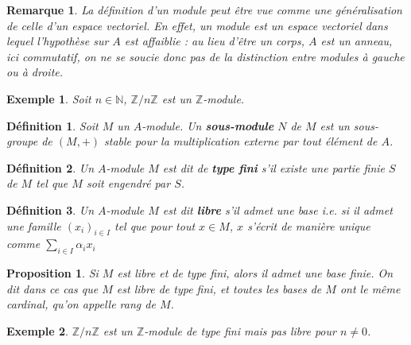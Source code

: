 \documentclass[a4paper,12pt]{report}  %
\theoremstyle{definitionstyle}
\newtheorem{definition}{Définition}[chapter] %
\theoremstyle{examplestyle}
\newtheorem{example}{Exemple}[chapter] %
\theoremstyle{remarkstyle}
\newtheorem{remark}{Remarque}[chapter] %
\theoremstyle{propositionstyle}
\newtheorem{proposition}{Proposition}[chapter]  %
\theoremstyle{theoremstyle}
\begin{document}
	\begin{remark}
		La définition d'un module peut être vue comme une généralisation de celle d'un espace vectoriel. En effet, un module est un espace vectoriel dans lequel l'hypothèse sur $A$ est affaiblie : au lieu d'être un corps, $A$ est un anneau, ici commutatif, on ne se soucie donc pas de la distinction entre modules à gauche ou à droite.
	\end{remark}

	
	\begin{example}
		Soit $n \in \mathbb{N}$, $\mathbb{Z}/n \mathbb{Z}$ est un $\mathbb{Z}$-module.
	\end{example}

	\begin{definition}
		Soit $M$ un $A$-module. Un \textbf{sous-module} $N$ de $M$ est un sous-groupe de $(M, +)$ stable pour la multiplication externe par tout élément de $A$.
	\end{definition}

	
	
	\begin{definition}
		Un $A$-module $M$ est dit de \textbf{type fini} s'il existe une partie finie $S$ de $M$ tel que $M$ soit engendré par $S$.
	\end{definition}

	\begin{definition}
		Un $A$-module $M$ est dit \textbf{libre} s'il admet une base i.e. si il admet une famille $(x_i)_{i \in I}$ tel que pour tout $x \in M$, $x$ s'écrit de manière unique comme $\sum_{i \in I} \alpha_i x_i$
	\end{definition}

	\begin{proposition}
		Si $M$ est libre et de type fini, alors il admet une base finie. On dit dans ce cas que $M$ est libre de type fini, et toutes les bases de $M$ ont le même cardinal, qu'on appelle rang de $M$.
	\end{proposition}

	\begin{example}
		$\mathbb{Z}/n \mathbb{Z}$ est un $\mathbb{Z}$-module de type fini mais pas libre pour $n \neq 0$.
	\end{example}
		
\end{document}
